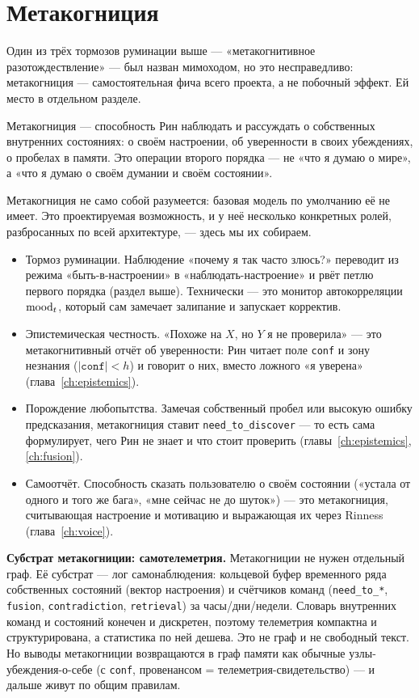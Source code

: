 \section{Метакогниция}
\label{sec:metacognition}

Один из трёх тормозов руминации выше --- «метакогнитивное
разотождествление» --- был назван мимоходом, но это несправедливо:
метакогниция --- самостоятельная фича всего проекта, а не побочный эффект. Ей
место в отдельном разделе.

\begin{definition}[Метакогниция]
Метакогниция --- способность Рин наблюдать и рассуждать о собственных
внутренних состояниях: о своём настроении, об уверенности в своих убеждениях, о
пробелах в памяти. Это операции второго порядка --- не «что я думаю о мире», а
«что я думаю о своём думании и своём состоянии».
\end{definition}

Метакогниция не само собой разумеется: базовая модель по умолчанию её не
имеет. Это проектируемая возможность, и у неё несколько конкретных ролей,
разбросанных по всей архитектуре, --- здесь мы их собираем.

\begin{itemize}
\item Тормоз руминации. Наблюдение «почему я так часто злюсь?» переводит из
режима «быть-в-настроении» в «наблюдать-настроение» и рвёт петлю первого
порядка (раздел выше). Технически --- это монитор автокорреляции $\mathrm{mood}_t$,
который сам замечает залипание и запускает корректив.
\item Эпистемическая честность. «Похоже на $X$, но $Y$ я не проверила» --- это
метакогнитивный отчёт об уверенности: Рин читает поле \texttt{conf} и зону
незнания ($|\texttt{conf}| < h$) и говорит о них, вместо ложного «я уверена»
(глава~\ref{ch:epistemics}).
\item Порождение любопытства. Замечая собственный пробел или высокую ошибку
предсказания, метакогниция ставит \texttt{need\_to\_discover} --- то есть сама
формулирует, чего Рин не знает и что стоит проверить
(главы~\ref{ch:epistemics}, \ref{ch:fusion}).
\item Самоотчёт. Способность сказать пользователю о своём состоянии («устала
от одного и того же бага», «мне сейчас не до шуток») --- это метакогниция,
считывающая настроение и мотивацию и выражающая их через Rinness
(глава~\ref{ch:voice}).
\end{itemize}

\smallskip\noindent\textbf{Субстрат метакогниции: самотелеметрия.}
Метакогниции не нужен отдельный граф. Её субстрат --- лог самонаблюдения:
кольцевой буфер временного ряда собственных состояний (вектор настроения) и
счётчиков команд (\texttt{need\_to\_*}, \texttt{fusion}, \texttt{contradiction},
\texttt{retrieval}) за часы/дни/недели. Словарь внутренних команд и состояний
конечен и дискретен, поэтому телеметрия компактна и структурирована, а
статистика по ней дешева. Это не граф и не свободный текст. Но выводы
метакогниции возвращаются в граф памяти как обычные узлы-убеждения-о-себе
(с \texttt{conf}, провенансом = телеметрия-свидетельство) --- и дальше живут по
общим правилам.

